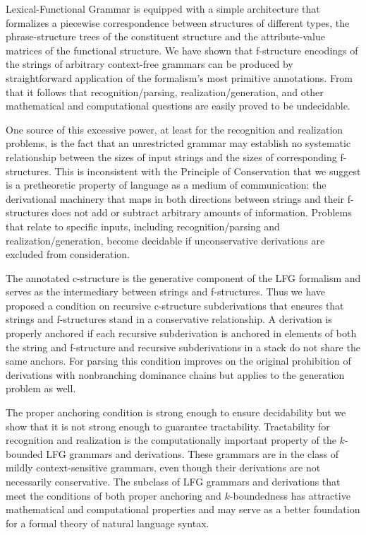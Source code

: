 \documentclass[output=paper,hidelinks]{langscibook}
\begin{document}
Lexical-Functional Grammar is equipped with a simple architecture that formalizes a piecewise correspondence between structures of different types, the phrase-structure trees of the constituent structure and the attribute-value matrices of the functional structure.  We have shown that f-structure encodings of the strings of arbitrary context-free grammars can be produced by straightforward application of the formalism's most primitive annotations.  From that it follows that recognition/parsing, realization/generation, and other mathematical and computational questions are easily proved to be undecidable.

One source of this excessive power, at least for the recognition and realization problems, is the fact that an unrestricted grammar may establish no systematic relationship between the sizes of input strings and the sizes of corresponding f-structures.  This is inconsistent with the Principle of Conservation  that we suggest is a pretheoretic property of language as a medium of communication: the derivational machinery that maps in both directions between strings and their f-structures does not add or subtract arbitrary amounts of information.  Problems that relate to specific inputs, including recognition/parsing and realization/generation, become decidable if unconservative derivations are excluded from consideration.

The annotated c-structure is the generative component of the LFG formalism and serves as the intermediary between strings and f-structures. Thus we have proposed a condition on recursive c-structure subderivations that ensures that strings and f-structures stand in a conservative relationship.  A derivation is properly anchored if each recursive subderivation is anchored in elements of both the string and f-structure and recursive subderivations in a stack do not share the same anchors.  For parsing this condition improves on the original prohibition of derivations with nonbranching dominance chains but applies to the generation problem as well.

The proper anchoring condition is strong enough to ensure decidability but we show that it is not strong enough to guarantee tractability.  Tractability for recognition and realization is the computationally important property of the $k$-bounded LFG grammars and derivations. These grammars are in the class of mildly context-sensitive grammars, even though their derivations are not necessarily conservative.   The subclass of LFG grammars and derivations that meet the conditions of both proper anchoring and $k$-boundedness has attractive mathematical and computational properties and may serve as a better foundation for a formal theory of natural language syntax.
\end{document}

